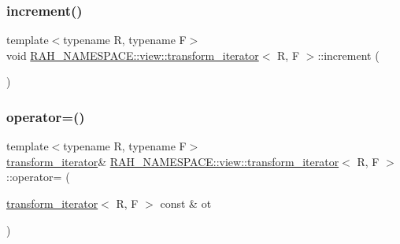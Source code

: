 \mbox{\label{struct_r_a_h___n_a_m_e_s_p_a_c_e_1_1view_1_1transform__iterator_a314c8d51a27d0d39f0a810e6fb7c1fc1}} 
\subsubsection{\texorpdfstring{increment()}{increment()}}
{\footnotesize\ttfamily template$<$typename R, typename F$>$ \\
void \mbox{\hyperlink{struct_r_a_h___n_a_m_e_s_p_a_c_e_1_1view_1_1transform__iterator}{R\+A\+H\+\_\+\+N\+A\+M\+E\+S\+P\+A\+C\+E\+::view\+::transform\+\_\+iterator}}$<$ R, F $>$\+::increment (\begin{DoxyParamCaption}{ }\end{DoxyParamCaption})\hspace{0.3cm}{\ttfamily [inline]}}

\mbox{\label{struct_r_a_h___n_a_m_e_s_p_a_c_e_1_1view_1_1transform__iterator_ae4aafe9c80f18c04166df44cfc7c9951}} 
\subsubsection{\texorpdfstring{operator=()}{operator=()}}
{\footnotesize\ttfamily template$<$typename R, typename F$>$ \\
\mbox{\hyperlink{struct_r_a_h___n_a_m_e_s_p_a_c_e_1_1view_1_1transform__iterator}{transform\+\_\+iterator}}\& \mbox{\hyperlink{struct_r_a_h___n_a_m_e_s_p_a_c_e_1_1view_1_1transform__iterator}{R\+A\+H\+\_\+\+N\+A\+M\+E\+S\+P\+A\+C\+E\+::view\+::transform\+\_\+iterator}}$<$ R, F $>$\+::operator= (\begin{DoxyParamCaption}\item[{\mbox{\hyperlink{struct_r_a_h___n_a_m_e_s_p_a_c_e_1_1view_1_1transform__iterator}{transform\+\_\+iterator}}$<$ R, F $>$ const \&}]{ot }\end{DoxyParamCaption})\hspace{0.3cm}{\ttfamily [inline]}}



